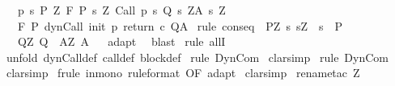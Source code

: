 \begin{isabellebody}
\ \ \ p{\isacharcolon}\ {\isachardoublequoteopen}{\isasymforall}s{\isasymin}\ P{\isachardot}\ {\isasymforall}Z{\isachardot}\ {\isasymGamma}{\isacharcomma}{\isasymTheta}{\isasymturnstile}\isactrlbsub {\isacharslash}F\isactrlesub \ {\isacharparenleft}P{\isacharprime}\ s\ Z{\isacharparenright}\ Call\ {\isacharparenleft}p\ s{\isacharparenright}\ {\isacharparenleft}Q{\isacharprime}\ s\ Z{\isacharparenright}{\isacharcomma}{\isacharparenleft}A{\isacharprime}\ s\ Z{\isacharparenright}{\isachardoublequoteclose}\isanewline
\ \ \ {\isachardoublequoteopen}{\isasymGamma}{\isacharcomma}{\isasymTheta}{\isasymturnstile}\isactrlbsub {\isacharslash}F\isactrlesub \ P\ dynCall\ init\ p\ return\ c\ Q{\isacharcomma}A{\isachardoublequoteclose}\isanewline
%
\isadelimproof
%
\endisadelimproof
%
\isatagproof
{}\isamarkupfalse%
\ {\isacharparenleft}rule\ conseq\ {\isacharbrackleft}\ P{\isacharprime}{\isacharequal}{\isachardoublequoteopen}{\isasymlambda}Z{\isachardot}\ {\isacharbraceleft}s{\isachardot}\ s{\isacharequal}Z\ {\isasymand}\ s\ {\isasymin}\ P{\isacharbraceright}{\isachardoublequoteclose}\isanewline
\ \ \ Q{\isacharprime}{\isacharequal}{\isachardoublequoteopen}{\isasymlambda}Z{\isachardot}\ Q{\isachardoublequoteclose}\ \ A{\isacharprime}{\isacharequal}{\isachardoublequoteopen}{\isasymlambda}Z{\isachardot}\ A{\isachardoublequoteclose}{\isacharbrackright}{\isacharparenright}\isanewline
{}\isamarkupfalse%
\ {}\isanewline
{}\isamarkupfalse%
\ adapt\isanewline
{}\isamarkupfalse%
\ \ blast\isanewline
{}\isamarkupfalse%
\ {\isacharparenleft}rule\ allI{\isacharparenright}\isanewline
{}\isamarkupfalse%
\ {\isacharparenleft}unfold\ dynCall{\isacharunderscore}def\ call{\isacharunderscore}def\ block{\isacharunderscore}def{\isacharparenright}\isanewline
{}\isamarkupfalse%
\ {\isacharparenleft}rule\ DynCom{\isacharparenright}\isanewline
{}\isamarkupfalse%
\ clarsimp\isanewline
{}\isamarkupfalse%
\ {\isacharparenleft}rule\ DynCom{\isacharparenright}\isanewline
{}\isamarkupfalse%
\ clarsimp\isanewline
{}\isamarkupfalse%
\ {\isacharparenleft}frule\ in{\isacharunderscore}mono\ {\isacharbrackleft}rule{\isacharunderscore}format{\isacharcomma}\ OF\ adapt{\isacharbrackright}{\isacharparenright}\isanewline
{}\isamarkupfalse%
\ clarsimp\isanewline
{}\isamarkupfalse%
\ {\isacharparenleft}rename{\isacharunderscore}tac\ Z{\isacharprime}{\isacharparenright}\isanewline

\end{isabellebody}
